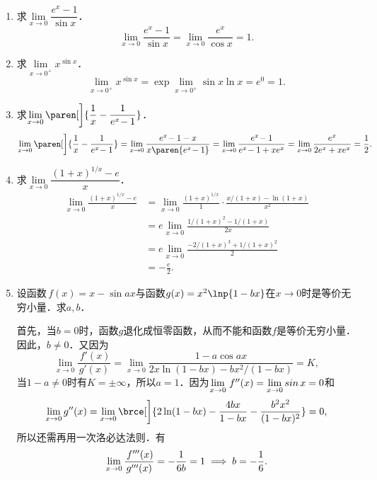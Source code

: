 \begin{enumerate}
\item 求\(\lim\limits_{x\to0} \dfrac{e^x\!-1}{\sin x}\)．
  \ifshowsol
  \begin{equation*}
    \lim_{x\to0} \frac{e^x\!-1}{\sin x}
    = \lim_{x\to0} \frac{e^x}{\cos x}
    = 1.
  \end{equation*}
  \fi

\item 求\(\!\lim\limits_{x\to0^+\!} x^{\sin x}\)．
  \ifshowsol
  \begin{equation*}
    \lim_{x\to0^+\!} x^{\sin x}
    = \exp \lim_{x\to0^+\!} \sin x \ln x
    = e^0 = 1.
  \end{equation*}
  \fi

\item 求\(\lim\limits_{x\to0} {}\paren[\bigg]{\dfrac1x - \dfrac1{e^x\!-1}}\)．
  \ifshowsol
  \begin{equation*}
    \lim_{x\to0} {}\paren[\bigg]{\frac1x - \frac1{e^x\!-1}}
    = \lim_{x\to0} \frac{e^x\!-1-x}{x \paren{e^x\!-1}}
    = \lim_{x\to0} \frac{e^x\!-1}{e^x\!-1 + xe^x}
    = \lim_{x\to0} \frac{e^x}{2e^x + xe^x}
    = \frac12.
  \end{equation*}
  \fi

\item 求\(\lim\limits_{x\to0} \dfrac{(1+x)^{1/x}\!-e}{x}\)．
  \ifshowsol
  \begin{equation*}
    \begin{split}
      \lim_{x\to0} \frac{(1+x)^{1/x}\!-e}{x}
      &= \lim_{x\to0} \frac{(1+x)^{1/x}}{1} \cdot \frac{x/(1+x) - \ln(1+x)}{x^2} \\
      &= e \lim_{x\to0} \frac{1/(1+x)^2 - 1/(1+x)}{2x} \\
      &= e \lim_{x\to0} \frac{-2/(1+x)^3 + 1/(1+x)^2}{2} \\
      &= - \frac e2.
    \end{split}
  \end{equation*}
  \fi

\item 设函数\(\,f(x) = x - \sin ax\)与函数\(g(x) = x^2 \lnp{1-bx}\)在\(x \to 0\)时是等价无穷小量．求\(a,b\)．

  \ifshowsol
  首先，当\(b = 0\)时，函数\(g\)退化成恒零函数，从而不能和函数\(f\)是等价无穷小量．因此，\(b \ne 0\)．又因为
  \begin{equation*}
    \lim_{x\to0} \frac{\,f'(x)}{g'(x)}
    = \lim_{x\to0} \frac{1-a\cos ax}{2x\ln(1-bx) - bx^2\!/(1-bx)}
    = K,
  \end{equation*}
  当\(1-a \ne 0\)时有\(K = \pm\infty\)，所以\(a = 1\)．因为\(\lim\limits_{x\to0}\,f''(x) = \lim\limits_{x\to0} \operatorname{\smash{sin}} x = 0\)和
  \begin{equation*}
    \lim_{x\to0} g\dpr(x)
    = \lim_{x\to0} {}\brce[\bigg]{2\ln(1-bx) - \frac{4bx}{1-bx} - \frac{b^2x^2}{(1-bx)^2}}
    = 0,
  \end{equation*}
  所以还需再用一次洛必达法则．有
  \begin{equation*}
    \lim_{x\to0} \frac{\,f'''(x)}{g'''(x)}
    = -\frac{1}{6b} = 1
    \implies
    b = -\frac16.
  \end{equation*}
  \fi


\end{enumerate}
